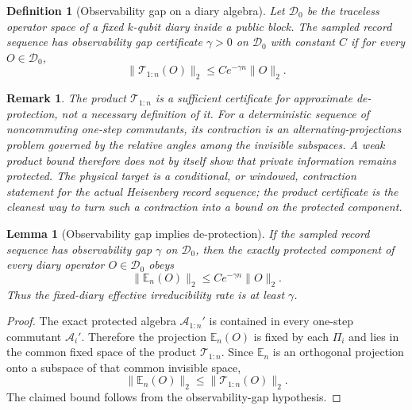 \documentclass[11pt]{article}
\newtheorem{lemma}{Lemma}
\newtheorem{definition}{Definition}
\newtheorem{remark}{Remark}
\newcommand{\cA}{\mathcal A}
\newcommand{\cD}{\mathcal D}
\newcommand{\cT}{\mathcal T}
\begin{document}
\begin{definition}[Observability gap on a diary algebra]
Let $\cD_0$ be the traceless operator space of a fixed $k$-qubit diary
inside a public block.  The sampled record sequence has observability
gap certificate $\gamma>0$ on $\cD_0$ with constant $C$ if for every
$O\in\cD_0$,
\begin{equation}
  \lVert \cT_{1:n}(O)\rVert_2
  \le
  C e^{-\gamma n}\lVert O\rVert_2 .
\end{equation}
\end{definition}

\begin{remark}
The product $\cT_{1:n}$ is a sufficient certificate for approximate
de-protection, not a necessary definition of it.  For a deterministic
sequence of noncommuting one-step commutants, its contraction is an
alternating-projections problem governed by the relative angles among
the invisible subspaces.  A weak product bound therefore does not by
itself show that private information remains protected.  The physical
target is a conditional, or windowed, contraction statement for the
actual Heisenberg record sequence; the product certificate is the
cleanest way to turn such a contraction into a bound on the protected
component.
\end{remark}

\begin{lemma}[Observability gap implies de-protection]
\label{lem:obs-gap}
If the sampled record sequence has observability gap $\gamma$ on
$\cD_0$, then the exactly protected component of every diary operator
$O\in\cD_0$ obeys
\begin{equation}
  \lVert \mathbb E_n(O)\rVert_2
  \le
  C e^{-\gamma n}\lVert O\rVert_2 .
\end{equation}
Thus the fixed-diary effective irreducibility rate is at least
$\gamma$.
\end{lemma}

\begin{proof}
The exact protected algebra $\cA_{1:n}'$ is contained in every one-step
commutant $\cA_i'$.  Therefore the projection $\mathbb E_n(O)$ is fixed
by each $\Pi_i$ and lies in the common fixed space of the product
$\cT_{1:n}$.  Since $\mathbb E_n$ is an orthogonal projection onto a
subspace of that common invisible space,
\begin{equation}
  \lVert \mathbb E_n(O)\rVert_2
  \le
  \lVert \cT_{1:n}(O)\rVert_2 .
\end{equation}
The claimed bound follows from the observability-gap hypothesis.
\end{proof}
\end{document}
